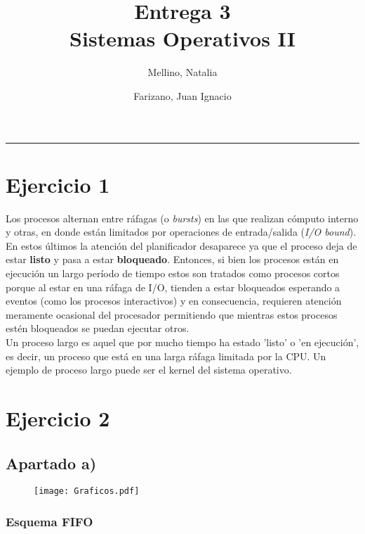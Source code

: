 \documentclass[11pt]{article}
\title{
    Entrega 3 \\
    \large Sistemas Operativos II}
\author{Mellino, Natalia \and Farizano, Juan Ignacio}
\date{}
\begin{document}
\maketitle

\noindent\rule{\textwidth}{1pt}

\section*{Ejercicio 1}

Los procesos alternan entre ráfagas (o \emph{bursts}) en las que realizan cómputo interno
y otras, en donde están limitados por operaciones de entrada/salida (\emph{I/O bound}). 
En estos últimos la atención del planificador desaparece ya que el proceso deja de
estar \textbf{listo} y pasa a estar \textbf{bloqueado}. Entonces, si bien los procesos están en ejecución un largo período de tiempo estos
son tratados como procesos cortos porque al estar en una ráfaga de I/O, tienden
a estar bloqueados esperando a eventos (como los procesos interactivos) y en consecuencia,
requieren atención meramente ocasional del procesador permitiendo que mientras estos
procesos estén bloqueados se puedan ejecutar otros. \\

Un proceso largo es aquel que por mucho tiempo ha estado 'listo' o 'en ejecución', es decir,
un proceso que está en una larga ráfaga limitada por la CPU. Un ejemplo de proceso
largo puede ser el kernel del sistema operativo.


\section*{Ejercicio 2}

\subsection*{Apartado a)}

\begin{figure}[h!]
    \begin{center}
      \texttt{[image: Graficos.pdf]}
    \end{center}
  \end{figure}

\subsubsection*{Esquema FIFO}
\end{document}
